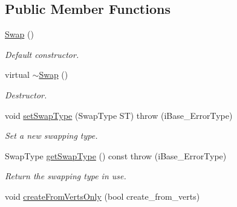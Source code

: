 \subsection*{Public Member Functions}
\begin{DoxyCompactItemize}
\item 
\hyperlink{class_i_t_a_p_s___swap_1_1_swap_a169ddddc93fdbddcca76a78e6df090d2}{Swap} ()
\begin{DoxyCompactList}\small\item\em Default constructor. \item\end{DoxyCompactList}\item 
\hypertarget{class_i_t_a_p_s___swap_1_1_swap_a081ac4a0a18d8d814c86dbe6092ee48d}{
virtual \hyperlink{class_i_t_a_p_s___swap_1_1_swap_a081ac4a0a18d8d814c86dbe6092ee48d}{$\sim$Swap} ()}
\label{class_i_t_a_p_s___swap_1_1_swap_a081ac4a0a18d8d814c86dbe6092ee48d}

\begin{DoxyCompactList}\small\item\em Destructor. \item\end{DoxyCompactList}\item 
void \hyperlink{class_i_t_a_p_s___swap_1_1_swap_a1cfc31d486bf82d7481ce87caec66853}{setSwapType} (SwapType ST)  throw (iBase\_\-ErrorType)
\begin{DoxyCompactList}\small\item\em Set a new swapping type. \item\end{DoxyCompactList}\item 
\hypertarget{class_i_t_a_p_s___swap_1_1_swap_a5b46657be10052f7546b320d8abef42c}{
SwapType \hyperlink{class_i_t_a_p_s___swap_1_1_swap_a5b46657be10052f7546b320d8abef42c}{getSwapType} () const   throw (iBase\_\-ErrorType)}
\label{class_i_t_a_p_s___swap_1_1_swap_a5b46657be10052f7546b320d8abef42c}

\begin{DoxyCompactList}\small\item\em Return the swapping type in use. \item\end{DoxyCompactList}\item 
\hypertarget{class_i_t_a_p_s___swap_1_1_swap_a4bca0bc9501a09e69d629aaa7c57a3d7}{
void \hyperlink{class_i_t_a_p_s___swap_1_1_swap_a4bca0bc9501a09e69d629aaa7c57a3d7}{createFromVertsOnly} (bool create\_\-from\_\-verts)}
\label{class_i_t_a_p_s___swap_1_1_swap_a4bca0bc9501a09e69d629aaa7c57a3d7}


\end{DoxyCompactItemize}
